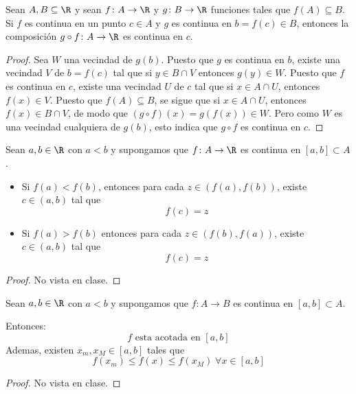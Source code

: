 \begin{theorem}
	Sean \(A,B \subseteq \R \) y sean \(f \colon A \to \R\) y \(g \colon B \to \R\) funciones tales que \(f(A) \subseteq B\). Si \(f \) es continua en un punto \(c \in A \) y \(g \) es continua en \(b = f(c ) \in B\), entonces la composición \(g \circ f\colon A \to \R\) es continua en \(c \).       
\end{theorem}
\begin{proof}
	Sea \(W \) una vecindad de \(g(b )\). Puesto que \(g \) es continua en \(b \), existe una vecindad \(V \) de \(b = f(c )\) tal que si \(y \in B \cap V\) entonces \(g(y) \in W \). Puesto que \(f \) es continua en \(c \), existe una vecindad \(U \) de \(c \) tal que si \(x \in A \cap U\), entonces \(f(x) \in V\). Puesto que \(f(A) \subseteq B\), se sigue que si \(x \in A \cap U \), entonces \(f(x) \in B \cap V \), de modo que \((g \circ  f)(x) = g(f(x)) \in W\). Pero como \(W \) es una vecindad cualquiera de \(g(b )\), esto indica que \(g \circ  f\) es continua en \(c \).          
\end{proof}
\begin{theorem}
	Sean \(a,b \in \R \) con \(a < b \) y supongamos que \(f\colon A \to \R \) es continua en \([a,b] \subset A \).
	
	\begin{itemize}
		\item Si \(f(a) < f(b )\), entonces para cada \(z \in (f(a), f(b ))\), existe \(c \in (a,b )\) tal que
		      \[
			      f(c) = z
		      \]
		\item Si \(f(a) > f(b)\) entonces para cada \(z \in (f(b), f(a ))\), existe \(c \in (a,b )\) tal que
		      \[
			      f(c) = z
		      \]
	\end{itemize}
\end{theorem}
\begin{proof}
	No vista en clase. 
\end{proof}

\begin{theorem}
	Sean \(a,b \in \R \) con \(a < b \) y supongamos que \(f \colon A \to B \) es continua en \([a,b] \subset A \).
	
	Entonces:
	\[
		f \text{ esta acotada en }[a,b]
	\]
	Ademas, existen \(x_m, x_M \in [a,b ]\) tales que
	\[
		f(x_m) \leq f(x) \leq f(x_M) \; \forall x \in [a,b ]
	\]
\end{theorem}
\begin{proof}
	No vista en clase. 
\end{proof}

